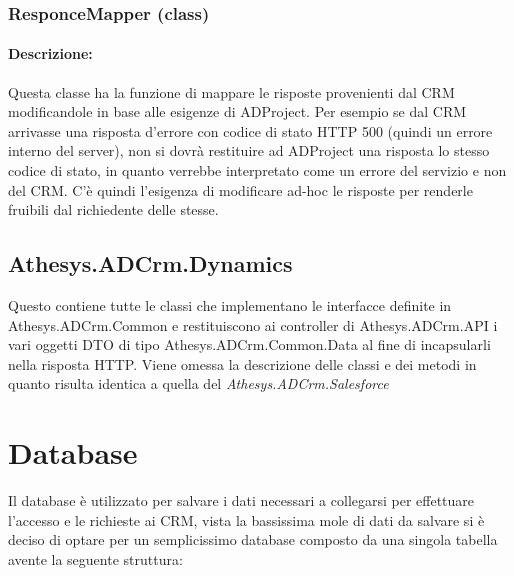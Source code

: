 \subsubsection{ResponceMapper (class)}
\paragraph{Descrizione:}
Questa classe ha la funzione di mappare le risposte provenienti dal CRM modificandole in base alle esigenze di ADProject.
Per esempio se dal CRM arrivasse una risposta d'errore con codice di stato HTTP 500 (quindi un errore interno del server), non si dovrà restituire ad ADProject una risposta lo stesso codice di stato, in quanto verrebbe interpretato come un errore del servizio e non del CRM. C'è quindi l'esigenza di modificare ad-hoc le risposte per renderle fruibili dal richiedente delle stesse.

\subsection{Athesys.ADCrm.Dynamics}
Questo  contiene tutte le classi che implementano le interfacce definite in Athesys.ADCrm.Common e restituiscono ai controller di Athesys.ADCrm.API i vari oggetti DTO di tipo Athesys.ADCrm.Common.Data al fine di incapsularli nella risposta HTTP.
Viene omessa la descrizione delle classi e dei metodi in quanto risulta identica a quella del  \textit{Athesys.ADCrm.Salesforce}

\section{Database}
Il database è utilizzato per salvare i dati necessari a collegarsi per effettuare l'accesso e le richieste ai CRM, vista la bassissima mole di dati da salvare si è deciso di optare per un semplicissimo database  composto da una singola tabella avente la seguente struttura:


 
